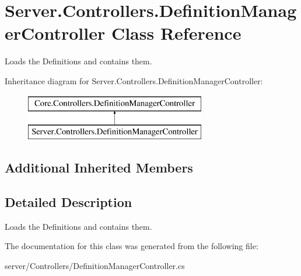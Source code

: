\hypertarget{classServer_1_1Controllers_1_1DefinitionManagerController}{\section{Server.\-Controllers.\-Definition\-Manager\-Controller Class Reference}
\label{classServer_1_1Controllers_1_1DefinitionManagerController}
}


Loads the Definitions and contains them.  


Inheritance diagram for Server.\-Controllers.\-Definition\-Manager\-Controller\-:\begin{figure}[H]
\begin{center}
\leavevmode
\includegraphics[height=2.000000cm]{classServer_1_1Controllers_1_1DefinitionManagerController}
\end{center}
\end{figure}
\subsection*{Additional Inherited Members}


\subsection{Detailed Description}
Loads the Definitions and contains them. 



The documentation for this class was generated from the following file\-:\begin{DoxyCompactItemize}
\item 
server/\-Controllers/Definition\-Manager\-Controller.\-cs\end{DoxyCompactItemize}
